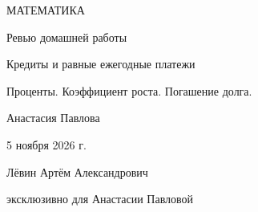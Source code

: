 \documentclass[a4paper,11pt]{article}
\begin{document}
\thispagestyle{empty}
\begin{center}
\vspace*{19mm}
{\large\color{accent} МАТЕМАТИКА}\par
\vspace{30mm}
{\Huge Ревью домашней работы}\par
\vspace{15mm}
{\Large\color{accent} Кредиты и равные ежегодные платежи}\par
\vspace{14mm}
{\normalsize Проценты. Коэффициент роста. Погашение долга.}\par
\vfill
{\large Анастасия Павлова}\par
\vspace{10mm}
{5 ноября 2026 г.}\par
\vspace{19mm}
{\small Лёвин Артём Александрович}\par
{\small эксклюзивно для Анастасии Павловой}\par
\vspace{15mm}
\end{center}
\clearpage
\end{document}
